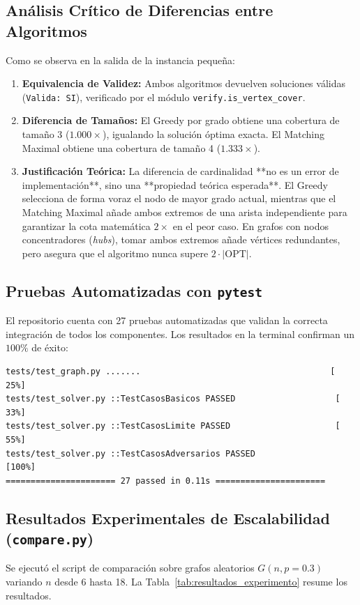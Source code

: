 \documentclass[11pt,a4paper]{article}
\begin{document}
\subsection{Análisis Crítico de Diferencias entre Algoritmos}
Como se observa en la salida de la instancia pequeña:
\begin{enumerate}[leftmargin=*]
    \item \textbf{Equivalencia de Validez:} Ambos algoritmos devuelven soluciones válidas (\texttt{Valida: SI}), verificado por el módulo \texttt{verify.is\_vertex\_cover}.
    \item \textbf{Diferencia de Tamaños:} El Greedy por grado obtiene una cobertura de tamaño 3 ($1.000\times$), igualando la solución óptima exacta. El Matching Maximal obtiene una cobertura de tamaño 4 ($1.333\times$).
    \item \textbf{Justificación Teórica:} La diferencia de cardinalidad **no es un error de implementación**, sino una **propiedad teórica esperada**. El Greedy selecciona de forma voraz el nodo de mayor grado actual, mientras que el Matching Maximal añade ambos extremos de una arista independiente para garantizar la cota matemática $2\times$ en el peor caso. En grafos con nodos concentradores (\textit{hubs}), tomar ambos extremos añade vértices redundantes, pero asegura que el algoritmo nunca supere $2 \cdot |\text{OPT}|$.
\end{enumerate}

\subsection{Pruebas Automatizadas con \texttt{pytest}}
El repositorio cuenta con 27 pruebas automatizadas que validan la correcta integración de todos los componentes. Los resultados en la terminal confirman un $100\%$ de éxito:

\begin{lstlisting}
tests/test_graph.py .......                                      [ 25%]
tests/test_solver.py ::TestCasosBasicos PASSED                    [ 33%]
tests/test_solver.py ::TestCasosLimite PASSED                     [ 55%]
tests/test_solver.py ::TestCasosAdversarios PASSED                [100%]
====================== 27 passed in 0.11s ======================
\end{lstlisting}

\subsection{Resultados Experimentales de Escalabilidad (\texttt{compare.py})}
Se ejecutó el script de comparación sobre grafos aleatorios $G(n, p=0.3)$ variando $n$ desde 6 hasta 18. La Tabla~\ref{tab:resultados_experimento} resume los resultados.
\end{document}
